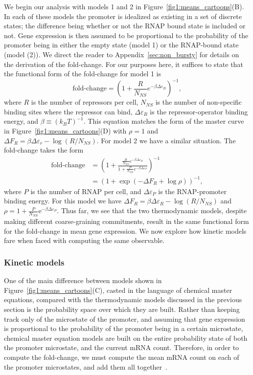 We begin our analysis with models 1 and 2 in
Figure~\ref{fig1:means_cartoons}(B). In each of these models the promoter is
idealized as existing in a set of discrete states; the difference being whether
or not the RNAP bound state is included or not. Gene expression is then assumed
to be proportional to the probability of the promoter being in either the empty
state (model 1) or the RNAP-bound state (model (2)). We direct the reader to
Appendix~\ref{sec:non_bursty} for details on the derivation of the fold-change.
For our purposes here, it suffices to state that the functional form of the
fold-change for model 1 is
\begin{equation}
\text{fold-change}
= \left(1 + \frac{R}{N_{NS}} e^{-\beta\Delta\varepsilon_R}\right)^{-1},
\end{equation}
where $R$ is the number of repressors per cell, $N_{NS}$ is the number of
non-specific binding sites where the repressor can bind, $\Delta\varepsilon_R$
is the repressor-operator binding energy, and $\beta \equiv (k_BT)^{-1}$. This
equation matches the form of the master curve in
Figure~\ref{fig1:means_cartoons}(D) with $\rho=1$ and $\Delta F_R =
\beta\Delta\varepsilon_r - \log (R / N_{NS})$. For model 2 we have a similar
situation. The fold-change takes the form
\begin{eqnarray}
\text{fold-change}
&= \left(
1 + \frac{\frac{R}{N_{NS}} e^{-\beta\Delta\varepsilon_R}}
        {1 + \frac{P}{N_{NS}} e^{-\beta\Delta\varepsilon_P}}
\right)^{-1}
\\
&= (1 + \exp(-\Delta F_R + \log\rho))^{-1},
\end{eqnarray}
where $P$ is the number of RNAP per cell, and $\Delta\varepsilon_P$ is the
RNAP-promoter binding energy. For this model we have $\Delta F_R =
\beta\Delta\varepsilon_R - \log(R/N_{NS})$ and $\rho = 1 +
\frac{P}{N_{NS}}\mathrm{e}^{-\beta\Delta\varepsilon_P}$. Thus far, we see that
the two thermodynamic models, despite making different coarse-graining
commitments, result in the same functional form for the fold-change in mean gene
expression.  We now explore how kinetic models fare when faced with computing
the same observable.

\subsubsection{Kinetic models}
One of the main difference between models shown in
Figure~\ref{fig1:means_cartoons}(C), casted in the language of chemical master
equations, compared with the thermodynamic models discussed in the previous 
section is the probability space over which they are built. Rather than keeping
track only of the microstate of the promoter, and assuming that gene expression
is proportional to the probability of the promoter being in a certain
microstate, chemical master equation models are built on the entire probability
state of both the promoter microstate, and the current mRNA count. Therefore, in
order to compute the fold-change, we must compute the mean mRNA count on each of
the promoter microstates, and add them all together~\cite{Sanchez2013}.

